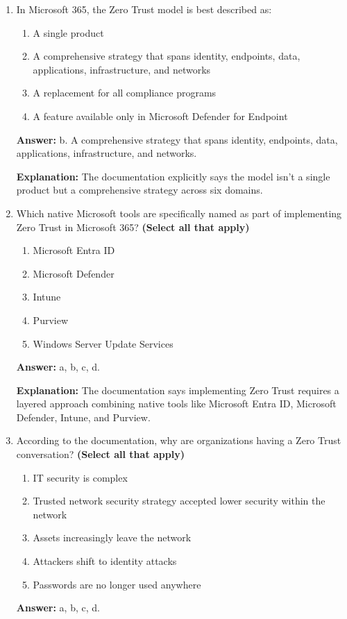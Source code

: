 \documentclass[10pt]{article}
\begin{document}
\begin{enumerate}[leftmargin=*]

\item In Microsoft 365, the Zero Trust model is best described as:
\begin{enumerate}[label=\alph*., leftmargin=1.5em]
\item A single product
\item A comprehensive strategy that spans identity, endpoints, data, applications, infrastructure, and networks
\item A replacement for all compliance programs
\item A feature available only in Microsoft Defender for Endpoint
\end{enumerate}
\textbf{Answer:} b. A comprehensive strategy that spans identity, endpoints, data, applications, infrastructure, and networks.

\textbf{Explanation:} The documentation explicitly says the model isn't a single product but a comprehensive strategy across six domains.

\item Which native Microsoft tools are specifically named as part of implementing Zero Trust in Microsoft 365? \textbf{(Select all that apply)}
\begin{enumerate}[label=\alph*., leftmargin=1.5em]
\item Microsoft Entra ID
\item Microsoft Defender
\item Intune
\item Purview
\item Windows Server Update Services
\end{enumerate}
\textbf{Answer:} a, b, c, d.

\textbf{Explanation:} The documentation says implementing Zero Trust requires a layered approach combining native tools like Microsoft Entra ID, Microsoft Defender, Intune, and Purview.

\item According to the documentation, why are organizations having a Zero Trust conversation? \textbf{(Select all that apply)}
\begin{enumerate}[label=\alph*., leftmargin=1.5em]
\item IT security is complex
\item Trusted network security strategy accepted lower security within the network
\item Assets increasingly leave the network
\item Attackers shift to identity attacks
\item Passwords are no longer used anywhere
\end{enumerate}
\textbf{Answer:} a, b, c, d.


\end{enumerate}
\end{document}
